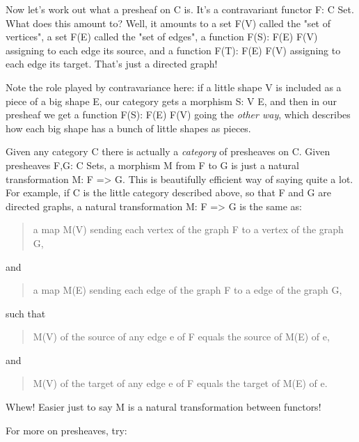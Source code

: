Now let's work out what a presheaf on C is.  It's a contravariant
functor F: C \to  Set.  What does this amount to?   Well, it amounts
to a set F(V) called the "set of vertices", a set F(E) called the
"set of edges", a function F(S): F(E) \to  F(V) assigning to each edge
its source, and a function F(T): F(E) \to  F(V) assigning to each edge
its target.  That's just a directed graph!  

Note the role played by contravariance here: if a little shape V is
included as a piece of a big shape E, our category gets a morphism 
S: V \to  E, and then in our presheaf we get a function F(S): F(E) \to  F(V)
going the \emph{other way}, which describes how each big shape has a bunch of
little shapes as pieces.

Given any category C there is actually a \emph{category} of presheaves on C.
Given presheaves F,G: C \to  Sets, a morphism M from F to G is just a
natural transformation M: F => G.  This is beautifully efficient way of
saying quite a lot.  For example, if C is the little category described
above, so that F and G are directed graphs, a natural transformation 
M: F => G is the same as:
\begin{quote}
    a map M(V) sending each vertex of the graph F to a vertex of the
    graph G,
\end{quote}
    
and 
\begin{quote}
    a map M(E) sending each edge of the graph F to a edge of the 
    graph G,
\end{quote}
    
such that
\begin{quote}
    M(V) of the source of any edge e of F equals the source of 
    M(E) of e,
\end{quote}
    
and
\begin{quote}
    M(V) of the target of any edge e of F equals the target of 
    M(E) of e.
\end{quote}
    
Whew!  Easier just to say M is a natural transformation between
functors!  

For more on presheaves, try:

